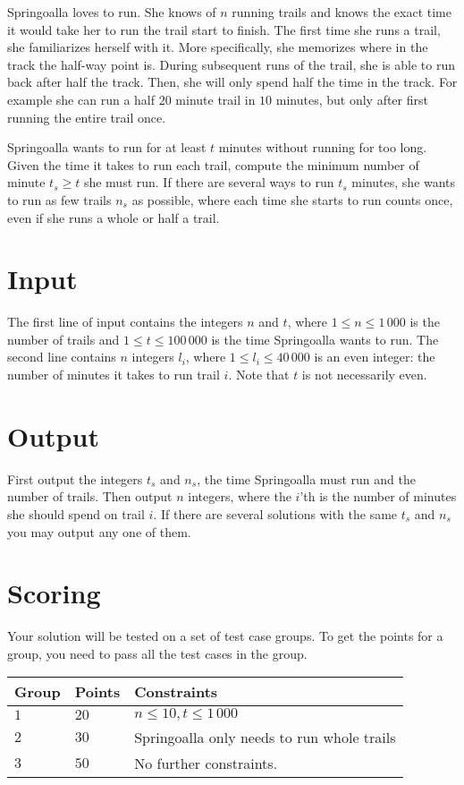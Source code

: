 Springoalla loves to run.
She knows of $n$ running trails and knows the exact time it would take her to run the trail start to finish.
The first time she runs a trail, she familiarizes herself with it.
More specifically, she memorizes where in the track the half-way point is.
During subsequent runs of the trail, she is able to run back after half the track.
Then, she will only spend half the time in the track.
For example she can run a half $20$ minute trail in $10$ minutes, but only after first running the entire trail once.

Springoalla wants to run for at least $t$ minutes without running for too long.
Given the time it takes to run each trail, compute the minimum number of minute $t_s \ge t$ she must run.
If there are several ways to run $t_s$ minutes, she wants to run as few trails $n_s$ as possible, where each time she starts to run counts once, even if she runs a whole or half a trail.

\section*{Input}
The first line of input contains the integers $n$ and $t$, where $1 \le n \le 1\,000$ is the number of trails and $1 \le t \le 100\,000$ is the time Springoalla wants to run.
The second line contains $n$ integers $l_i$, where $1 \le l_i \le 40\,000$ is an even integer: the number of minutes it takes to run trail $i$.
Note that $t$ is not necessarily even.

\section*{Output}
First output the integers $t_s$ and $n_s$, the time Springoalla must run and the number of trails.
Then output $n$ integers, where the $i$'th is the number of minutes she should spend on trail $i$.
If there are several solutions with the same $t_s$ and $n_s$ you may output any one of them.

\section*{Scoring}
Your solution will be tested on a set of test case groups.
To get the points for a group, you need to pass all the test cases in the group.

\noindent
\begin{tabular}{| l | l | p{10cm} |}
\hline
Group & Points & Constraints \\ \hline
  $1$    & $20$        & $n \le 10, t \le 1\,000$ \\ \hline 
  $2$    & $30$        & Springoalla only needs to run whole trails \\ \hline
  $3$    & $50$        & No further constraints. \\ \hline 
\end{tabular}

